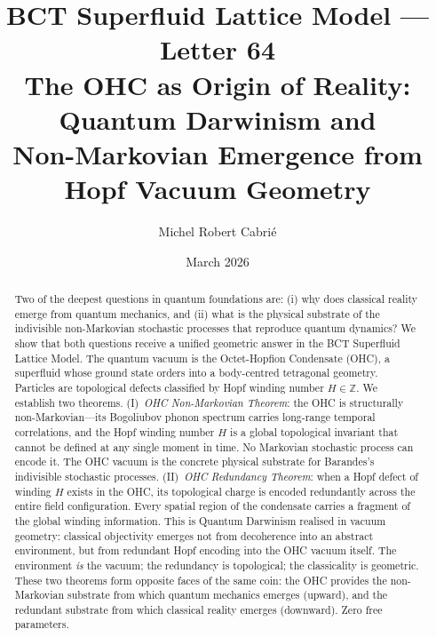 \documentclass[aps,prl,preprint,superscriptaddress,floatfix]{revtex4-2}
\begin{document}
\title{BCT Superfluid Lattice Model --- Letter 64\\
The OHC as Origin of Reality: Quantum Darwinism and\\
Non-Markovian Emergence from Hopf Vacuum Geometry}

\author{Michel Robert Cabri\'e}
\date{March 2026}

\begin{abstract}
Two of the deepest questions in quantum foundations are: (i) why does classical
reality emerge from quantum mechanics, and (ii) what is the physical substrate
of the indivisible non-Markovian stochastic processes that reproduce quantum
dynamics? We show that both questions receive a unified geometric answer in
the BCT Superfluid Lattice Model. The quantum vacuum is the Octet-Hopfion
Condensate (OHC), a superfluid whose ground state orders into a body-centred
tetragonal geometry. Particles are topological defects classified by Hopf
winding number $H\in\mathbb{Z}$. We establish two theorems. (I)~\textit{OHC
Non-Markovian Theorem}: the OHC is structurally non-Markovian---its Bogoliubov
phonon spectrum carries long-range temporal correlations, and the Hopf winding
number $H$ is a global topological invariant that cannot be defined at any
single moment in time. No Markovian stochastic process can encode it. The OHC
vacuum is the concrete physical substrate for Barandes's indivisible stochastic
processes. (II)~\textit{OHC Redundancy Theorem}: when a Hopf defect of winding
$H$ exists in the OHC, its topological charge is encoded redundantly across
the entire field configuration. Every spatial region of the condensate carries
a fragment of the global winding information. This is Quantum Darwinism
realised in vacuum geometry: classical objectivity emerges not from decoherence
into an abstract environment, but from redundant Hopf encoding into the OHC
vacuum itself. The environment \textit{is} the vacuum; the redundancy is
topological; the classicality is geometric. These two theorems form opposite
faces of the same coin: the OHC provides the non-Markovian substrate from which
quantum mechanics emerges (upward), and the redundant substrate from which
classical reality emerges (downward). Zero free parameters.
\end{abstract}

\maketitle
\end{document}
